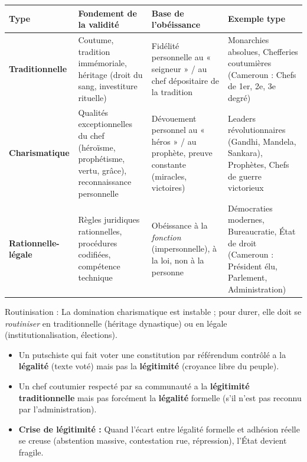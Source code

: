 \documentclass[11pt]{article}
\newcommand{\cle}[1]{{\popxbold\color{popdark}#1}}
\begin{document}
\begin{propriete}
\begin{center}
\begin{tabularx}{\linewidth}{|l|X|X|X|}\hline
\textbf{Type} & \textbf{Fondement de la validité} & \textbf{Base de l'obéissance} & \textbf{Exemple type} \\ \hline
\textbf{Traditionnelle} & Coutume, tradition immémoriale, héritage (droit du sang, investiture rituelle) & Fidélité personnelle au « seigneur » / au chef dépositaire de la tradition & Monarchies absolues, Chefferies coutumières (Cameroun : Chefs de 1er, 2e, 3e degré) \\ \hline
\textbf{Charismatique} & Qualités exceptionnelles du chef (héroïsme, prophétisme, vertu, grâce), reconnaissance personnelle & Dévouement personnel au « héros » / au prophète, preuve constante (miracles, victoires) & Leaders révolutionnaires (Gandhi, Mandela, Sankara), Prophètes, Chefs de guerre victorieux \\ \hline
\textbf{Rationnelle-légale} & Règles juridiques rationnelles, procédures codifiées, compétence technique & Obéissance à la \emph{fonction} (impersonnelle), à la loi, non à la personne & Démocraties modernes, Bureaucratie, État de droit (Cameroun : Président élu, Parlement, Administration) \\ \hline
\end{tabularx}
\end{center}
\cle{Routinisation} : La domination charismatique est instable ; pour durer, elle doit se \emph{routiniser} en traditionnelle (héritage dynastique) ou en légale (institutionalisation, élections).
\end{propriete}

\begin{attention}
\begin{itemize}
    \item Un putschiste qui fait voter une constitution par référendum contrôlé a la \textbf{légalité} (texte voté) mais pas la \textbf{légitimité} (croyance libre du peuple).
    \item Un chef coutumier respecté par sa communauté a la \textbf{légitimité traditionnelle} mais pas forcément la \textbf{légalité} formelle (s'il n'est pas reconnu par l'administration).
    \item \textbf{Crise de légitimité :} Quand l'écart entre légalité formelle et adhésion réelle se creuse (abstention massive, contestation rue, répression), l'État devient fragile.
\end{itemize}
\end{attention}
\end{document}
